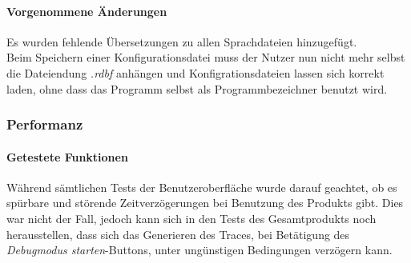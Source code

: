 \documentclass[parskip=full]{scrartcl}
\begin{document}
\paragraph{Vorgenommene Änderungen}
Es wurden fehlende Übersetzungen zu allen Sprachdateien hinzugefügt. \\
Beim Speichern einer Konfigurationsdatei muss der Nutzer nun nicht mehr selbst die Dateiendung \textit{.rdbf} anhängen und Konfigrationsdateien lassen sich korrekt laden, ohne dass das Programm selbst als Programmbezeichner benutzt wird.
\subsubsection{Performanz}
\paragraph{Getestete Funktionen}
Während sämtlichen Tests der Benutzeroberfläche wurde darauf geachtet, ob es spürbare und störende Zeitverzögerungen bei Benutzung des Produkts gibt. Dies war nicht der Fall, jedoch kann sich in den Tests des Gesamtprodukts noch herausstellen, dass sich das Generieren des Traces, bei Betätigung des \textit{Debugmodus starten}-Buttons, unter ungünstigen Bedingungen verzögern kann.

\label{testszenarien}
\end{document}

